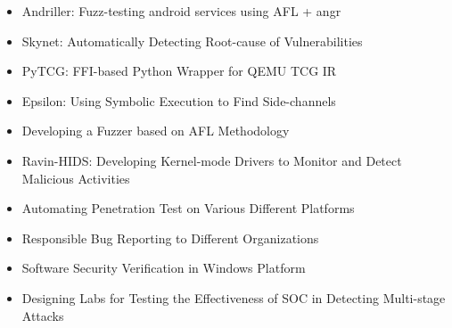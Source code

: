 \begin{itemize}
\item Andriller: Fuzz-testing android services using AFL + angr
\item Skynet: Automatically Detecting Root-cause of Vulnerabilities
\item PyTCG: FFI-based Python Wrapper for QEMU TCG IR
\item Epsilon: Using Symbolic Execution to Find Side-channels
\item Developing a Fuzzer based on AFL Methodology
\end{itemize}

\divider

\begin{itemize}
\item Ravin-HIDS: Developing Kernel-mode Drivers to Monitor and Detect Malicious Activities
\end{itemize}

\divider

\begin{itemize}
\item Automating Penetration Test on Various Different Platforms
\item Responsible Bug Reporting to Different Organizations
\end{itemize}

\divider

\begin{itemize}
\item Software Security Verification in Windows Platform
\end{itemize}

\divider

\begin{itemize}
\item Designing Labs for Testing the Effectiveness of SOC in Detecting Multi-stage Attacks
\end{itemize}


